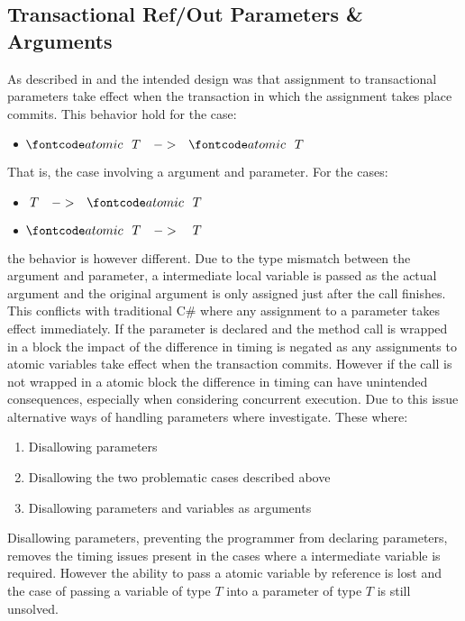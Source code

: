 \subsection{Transactional Ref/Out Parameters \& Arguments}
As described in  and  the intended design was that assignment to transactional  parameters take effect when the transaction in which the assignment takes place commits. This behavior hold for the case:
\begin{itemize}
	\item $\bscode{atomic} \quad T \quad->\quad \bscode{atomic} \quad T$
\end{itemize}
That is, the case involving a  argument and parameter. For the cases:
\begin{itemize}
	\item $T \quad -> \quad \bscode{atomic} \quad T$
	\item $\bscode{atomic} \quad T \quad -> \quad T$
\end{itemize}
the behavior is however different. Due to the type mismatch between the argument and parameter, a intermediate local variable is passed as the actual argument and the original argument is only assigned just after the call finishes. This conflicts with traditional C\# where any assignment to a  parameter takes effect immediately\cite[p. 76]{sestoft2011c}. If the parameter is declared  and the method call is wrapped in a  block the impact of the difference in timing is negated as any assignments to atomic variables take effect when the transaction commits. However if the call is not wrapped in a atomic block the difference in timing can have unintended consequences, especially when considering concurrent execution. Due to this issue alternative ways of handling  parameters where investigate. These where:
\begin{enumerate}
	\item Disallowing  parameters
	\item Disallowing the two problematic cases described above
	\item Disallowing  parameters and  variables as  arguments
\end{enumerate}
Disallowing  parameters, preventing the programmer from declaring  parameters, removes the timing issues present in the cases where a intermediate  variable is required. However the ability to pass a atomic variable by reference is lost and the case of passing a variable of type  $T$ into a parameter of type $T$ is still unsolved.

